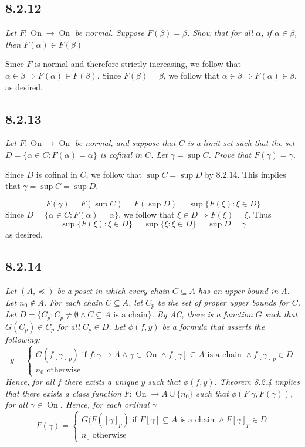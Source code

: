 \documentclass[11pt,oneside,titlepage]{book}
\DeclareMathOperator \ra {\Rightarrow}
\DeclareMathOperator \On {On}
\newcommand{\set}[1]{\{ #1 \}}
\begin{document}
\subsection*{8.2.12}

\textit{Let $F: \On \to \On$ be normal. Suppose $F(\beta) = \beta$. Show that
  for all $\alpha$, if $\alpha \in \beta$, then $F(\alpha) \in F(\beta)$}

Since $F$ is normal and therefore strictly increasing, we follow
that $\alpha \in \beta \ra F(\alpha) \in F(\beta)$. Since $F(\beta) = \beta$, we follow that
$\alpha \in \beta \ra F(\alpha) \in \beta$, as desired.

\subsection*{8.2.13}

\textit{Let $F: \On \to \On$ be normal, and suppose that $C$ is a limit set such that the
  set $D = \set{\alpha \in C: F(\alpha) = \alpha}$ is cofinal in $C$. Let $\gamma = \sup C$.
  Prove that $F(\gamma) = \gamma$. }

Since $D$ is cofinal in $C$, we follow that $\sup C = \sup D$ by 8.2.14. This implies that
$\gamma = \sup C = \sup D$.

$$F(\gamma) = F(\sup C) = F(\sup D) = \sup\set{F(\xi): \xi \in D}$$
Since $D = \set{\alpha \in C: F(\alpha) = \alpha}$, we follow that $\xi \in D \ra F(\xi) = \xi$.
Thus
$$\sup\set{F(\xi): \xi \in D} = \sup\set{\xi: \xi \in D} = \sup D = \gamma$$
as desired.

\subsection*{8.2.14}

\textit{Let $(A, \preceq)$ be a poset in which every chain $C \subseteq A$ has an upper
  bound in $A$. Let $n_0 \notin A$. For each chain $C \subseteq A$, let $C_p$ be the set
  of proper upper bounds for $C$. Let
  $D  = \set{C_p: C_p \neq \emptyset \land C \subseteq A \text{ is a chain}}$. By AC,
  there is a function $G$ such that $G(C_p) \in C_p$ for all $C_p \in D$.
  Let $\phi(f, y)$ be a formula that asserts the following:
  $$y =
  \begin{cases}
    G(f[\gamma]_p) \text { if } f: \gamma \to A \land \gamma \in \On \land f[\gamma] \subseteq A
    \text{ is a chain } \land f[\gamma]_p \in D \\
    n_0 \text{ otherwise}
  \end{cases}
  $$
  Hence, for all $f$ there exists a unique $y$ such that $\phi(f, y)$. Theorem 8.2.4 implies that
  there exists a class function $F: \On \to A \cup \set{n_0}$ such that
  $\phi(F|\gamma, F(\gamma))$, for all $\gamma \in \On$. Hence, for each ordinal $\gamma$
  $$F(\gamma) =
  \begin{cases}
    G(F([\gamma]_p) \text{ if } F[\gamma] \subseteq A \text{ is a chain }
    \land F[\gamma]_p \in D \\
    n_0 \text{ otherwise}
  \end{cases}
  $$
}
\end{document}
